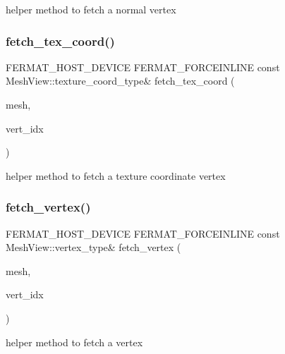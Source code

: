 helper method to fetch a normal vertex \mbox{\label{group___mesh_module_gae33ea9281c4276a5132e37c0b1331069}} 
\subsubsection{\texorpdfstring{fetch\+\_\+tex\+\_\+coord()}{fetch\_tex\_coord()}}
{\footnotesize\ttfamily F\+E\+R\+M\+A\+T\+\_\+\+H\+O\+S\+T\+\_\+\+D\+E\+V\+I\+CE F\+E\+R\+M\+A\+T\+\_\+\+F\+O\+R\+C\+E\+I\+N\+L\+I\+NE const Mesh\+View\+::texture\+\_\+coord\+\_\+type\& fetch\+\_\+tex\+\_\+coord (\begin{DoxyParamCaption}\item[{const \hyperlink{struct_mesh_view}{Mesh\+View} \&}]{mesh,  }\item[{const uint32}]{vert\+\_\+idx }\end{DoxyParamCaption})}

helper method to fetch a texture coordinate vertex \mbox{\label{group___mesh_module_ga4b65791b4c323a93e391c4c2e88cd601}} 
\subsubsection{\texorpdfstring{fetch\+\_\+vertex()}{fetch\_vertex()}}
{\footnotesize\ttfamily F\+E\+R\+M\+A\+T\+\_\+\+H\+O\+S\+T\+\_\+\+D\+E\+V\+I\+CE F\+E\+R\+M\+A\+T\+\_\+\+F\+O\+R\+C\+E\+I\+N\+L\+I\+NE const Mesh\+View\+::vertex\+\_\+type\& fetch\+\_\+vertex (\begin{DoxyParamCaption}\item[{const \hyperlink{struct_mesh_view}{Mesh\+View} \&}]{mesh,  }\item[{const uint32}]{vert\+\_\+idx }\end{DoxyParamCaption})}

helper method to fetch a vertex \mbox{\label{group___mesh_module_gac16c0ec581833a6cf3f821d0edeb698b}} 
